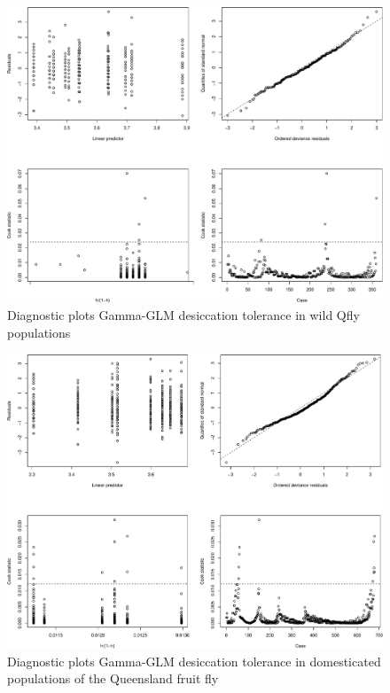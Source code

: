 \documentclass[]{article}
\begin{document}
\begin{figure}

{\centering \includegraphics{Supplementary_files/figure-latex/Diagnostic plots desiccation wild populations-1} 

}

\caption{Diagnostic plots Gamma-GLM desiccation tolerance in wild Qfly populations}\label{fig:Diagnostic plots desiccation wild populations}
\end{figure}

\begin{figure}

{\centering \includegraphics{Supplementary_files/figure-latex/Diagnostic plots desiccation tolerance in domesticated flies-1} 

}

\caption{Diagnostic plots Gamma-GLM desiccation tolerance in domesticated populations of the Queensland fruit fly}\label{fig:Diagnostic plots desiccation tolerance in domesticated flies}
\end{figure}
\end{document}
